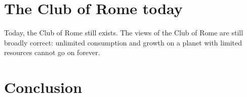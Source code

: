 \documentclass[10pt,a4paper]{scrartcl}
\begin{document}
\section*{The Club of Rome today}

Today, the Club of Rome still exists. The views of the Club of Rome are still broadly correct: unlimited consumption and growth on a planet with limited resources cannot go on forever.

\section*{Conclusion}




\nocite{*}

\end{document}
